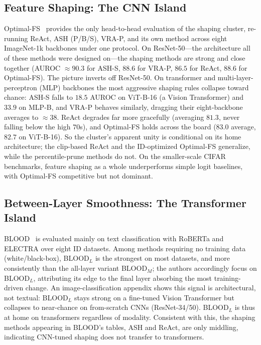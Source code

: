 \documentclass[a4paper]{article}
\begin{document}
\subsection{Feature Shaping: The CNN Island}
\label{subsec:exp-vision}

Optimal-FS~\citep{optimalfs} provides the only head-to-head evaluation of the shaping
cluster, re-running ReAct, ASH (P/B/S), VRA-P, and its own method across eight
ImageNet-1k backbones under one protocol. On ResNet-50---the architecture all of these
methods were designed on---the shaping methods are strong and close together (AUROC
$\approx 90.3$ for ASH-S, $88.6$ for VRA-P, $86.5$ for ReAct, $88.6$ for Optimal-FS).
The picture inverts off ResNet-50. On transformer and multi-layer-perceptron (MLP)
backbones the most aggressive shaping rules collapse toward chance: ASH-S falls to
$18.5$ AUROC on ViT-B-16 (a Vision Transformer) and
$33.9$ on MLP-B, and VRA-P behaves similarly, dragging their eight-backbone averages to
$\approx 38$. ReAct degrades far more gracefully (averaging $81.3$, never falling below
the high $70$s), and Optimal-FS holds across the board ($83.0$ average, $82.7$ on
ViT-B-16). So the cluster's apparent unity is conditional on its home architecture; the
clip-based ReAct and the ID-optimized Optimal-FS generalize, while the percentile-prune
methods do not. On the smaller-scale CIFAR benchmarks, feature shaping as a whole
underperforms simple logit baselines, with Optimal-FS competitive but not dominant.

\subsection{Between-Layer Smoothness: The Transformer Island}
\label{subsec:exp-text}

BLOOD~\citep{blood} is evaluated mainly on text classification with RoBERTa and
ELECTRA over eight ID datasets. Among methods requiring no training data
(white/black-box), BLOOD$_L$ is the strongest on most datasets, and more consistently
than the all-layer variant BLOOD$_M$; the authors accordingly focus on BLOOD$_L$,
attributing its edge to the final layer absorbing the most training-driven change. An
image-classification appendix shows this signal is architectural, not textual:
BLOOD$_L$ stays strong on a fine-tuned Vision Transformer but collapses to near-chance
on from-scratch CNNs (ResNet-34/50). BLOOD$_L$ is thus at home on transformers
regardless of modality. Consistent with this, the shaping methods appearing in BLOOD's tables, ASH and
ReAct, are only middling, indicating CNN-tuned shaping does not transfer to
transformers.
\end{document}
